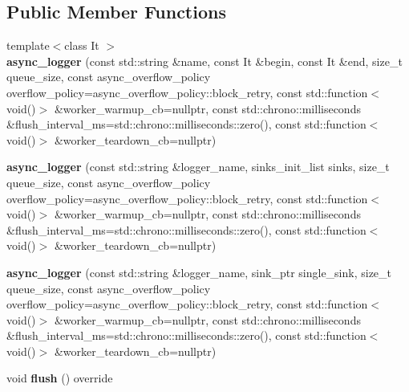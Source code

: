 \subsection*{Public Member Functions}
\begin{DoxyCompactItemize}
\item 
{\footnotesize template$<$class It $>$ }\\{\bfseries async\+\_\+logger} (const std\+::string \&name, const It \&begin, const It \&end, size\+\_\+t queue\+\_\+size, const async\+\_\+overflow\+\_\+policy overflow\+\_\+policy=async\+\_\+overflow\+\_\+policy\+::block\+\_\+retry, const std\+::function$<$ void()$>$ \&worker\+\_\+warmup\+\_\+cb=nullptr, const std\+::chrono\+::milliseconds \&flush\+\_\+interval\+\_\+ms=std\+::chrono\+::milliseconds\+::zero(), const std\+::function$<$ void()$>$ \&worker\+\_\+teardown\+\_\+cb=nullptr)\hypertarget{classspdlog_1_1SPDLOG__FINAL_a8d7804abd9cfdf2258beecc99e91d15d}{}\label{classspdlog_1_1SPDLOG__FINAL_a8d7804abd9cfdf2258beecc99e91d15d}

\item 
{\bfseries async\+\_\+logger} (const std\+::string \&logger\+\_\+name, sinks\+\_\+init\+\_\+list sinks, size\+\_\+t queue\+\_\+size, const async\+\_\+overflow\+\_\+policy overflow\+\_\+policy=async\+\_\+overflow\+\_\+policy\+::block\+\_\+retry, const std\+::function$<$ void()$>$ \&worker\+\_\+warmup\+\_\+cb=nullptr, const std\+::chrono\+::milliseconds \&flush\+\_\+interval\+\_\+ms=std\+::chrono\+::milliseconds\+::zero(), const std\+::function$<$ void()$>$ \&worker\+\_\+teardown\+\_\+cb=nullptr)\hypertarget{classspdlog_1_1SPDLOG__FINAL_a855d21b6ac96d191a4ed339a97d73e5d}{}\label{classspdlog_1_1SPDLOG__FINAL_a855d21b6ac96d191a4ed339a97d73e5d}

\item 
{\bfseries async\+\_\+logger} (const std\+::string \&logger\+\_\+name, sink\+\_\+ptr single\+\_\+sink, size\+\_\+t queue\+\_\+size, const async\+\_\+overflow\+\_\+policy overflow\+\_\+policy=async\+\_\+overflow\+\_\+policy\+::block\+\_\+retry, const std\+::function$<$ void()$>$ \&worker\+\_\+warmup\+\_\+cb=nullptr, const std\+::chrono\+::milliseconds \&flush\+\_\+interval\+\_\+ms=std\+::chrono\+::milliseconds\+::zero(), const std\+::function$<$ void()$>$ \&worker\+\_\+teardown\+\_\+cb=nullptr)\hypertarget{classspdlog_1_1SPDLOG__FINAL_a8eb3cb8f76b0085eef4b2a76eb4f9aeb}{}\label{classspdlog_1_1SPDLOG__FINAL_a8eb3cb8f76b0085eef4b2a76eb4f9aeb}

\item 
void {\bfseries flush} () override\hypertarget{classspdlog_1_1SPDLOG__FINAL_ad59f988274b7d8915af69b297ca632ff}{}\label{classspdlog_1_1SPDLOG__FINAL_ad59f988274b7d8915af69b297ca632ff}


\end{DoxyCompactItemize}
